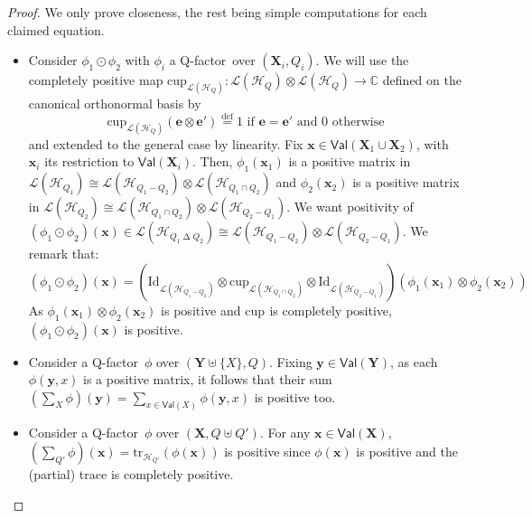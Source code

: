 \documentclass[10pt,a4paper]{article}
\newcommand*{\defeq}{\stackrel{\text{def}}{=}}
\newcommand*{\symdif}{\mathrel{\Delta}}
\newcommand*{\difset}{\mathrel{-}}
\newcommand*{\tens}{\otimes}
\newcommand*{\compfact}{\odot}
\newcommand*{\setofrv}[1]{\mathsf{Val}(#1)}
\newcommand{\bX}{\mathbf X}
\newcommand{\bY}{\mathbf Y}
\newcommand{\bx}{{\mathbf x}}
\newcommand{\by}{{\mathbf y}}
\newcommand{\be}{{\mathbf e}}
\newcommand{\ptr}[1]{\mathrm{tr}_{#1}}
\renewcommand{\L}{\mathcal{L}}
\newcommand*{\C}{\mathbb{C}}
\newcommand{\HH}{\mathcal{H}}
\newcommand{\reg}{Q}
\newcommand{\qreg}{\reg}
\newcommand*{\someqfact}{\phi}
\newcommand*{\id}[1][]{\mathrm{Id}_{#1}}
\newcommand*{\qcup}[1][]{\mathrm{cup}_{#1}}
\newcommand*{\qfactor}{Q-factor}
\begin{document}
\qfactors*
\begin{proof}
We only prove closeness, the rest being simple computations for each claimed equation.
\begin{itemize}
\item
Consider $\someqfact_1\compfact \someqfact_2$ with $\someqfact_i$ a \qfactor\ over $(\bX_i,\qreg_i)$.
We will use the completely positive map $\qcup[\L(\HH_{\qreg})]:\L(\HH_{\qreg})\tens\L(\HH_{\qreg})\to\C$ defined on the canonical orthonormal basis by
\begin{equation*}
\qcup[\L(\HH_{\qreg})](\be \tens \be') \defeq 1 \text{ if } \be=\be' \text{ and } 0 \text{ otherwise}
\end{equation*}
and extended to the general case by linearity.
Fix $\bx\in\setofrv{\bX_1\cup\bX_2}$, with $\bx_i$ its restriction to $\setofrv{\bX_i}$.
Then, $\someqfact_1(\bx_1)$ is a positive matrix in $\L(\HH_{\qreg_1})\cong\L(\HH_{\qreg_1\difset\qreg_2})\tens\L(\HH_{\qreg_1\cap\qreg_2})$ and $\someqfact_2(\bx_2)$ is a positive matrix in $\L(\HH_{\qreg_2})\cong\L(\HH_{\qreg_1\cap\qreg_2})\tens\L(\HH_{\qreg_2\difset\qreg_1})$.
We want positivity of $(\someqfact_1 \compfact \someqfact_2) (\bx) \in \L(\HH_{\qreg_1\symdif\qreg_2})\cong\L(\HH_{\qreg_1\difset\qreg_2})\tens\L(\HH_{\qreg_2\difset\qreg_1})$.
We remark that:
\begin{equation*}
(\someqfact_1 \compfact \someqfact_2) (\bx)
=
\left(\id[\L(\HH_{\qreg_1\difset\qreg_2})] \tens \qcup[\L(\HH_{\qreg_1\cap\qreg_2})] \tens \id[\L(\HH_{\qreg_2\difset\qreg_1})]\right)
\left(\someqfact_1(\bx_1) \tens \someqfact_2(\bx_2)\right)
\end{equation*}
As $\someqfact_1(\bx_1) \tens \someqfact_2(\bx_2)$ is positive and $\qcup$ is completely positive, $(\someqfact_1 \compfact \someqfact_2) (\bx)$ is positive.
\item
Consider a \qfactor\ $\someqfact$ over $(\bY\uplus\{X\},\qreg)$.
Fixing $\by\in\setofrv{\bY}$, as each $\someqfact(\by,x)$ is a positive matrix, it follows that their sum $(\sum_X \someqfact) (\by) = \sum_{x\in\setofrv{X}}\someqfact(\by,x)$ is positive too.
\item
Consider a \qfactor\ $\someqfact$ over $(\bX,\qreg\uplus\qreg')$.
For any $\bx\in\setofrv{\bX}$, $(\sum_{\qreg'} \someqfact) (\bx) = \ptr{\HH_{\qreg'}}\left(\someqfact(\bx)\right)$ is positive since $\someqfact(\bx)$ is positive and the (partial) trace is completely positive.
\qedhere
\end{itemize}
\end{proof}
\end{document}
